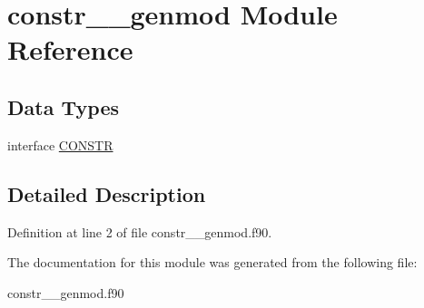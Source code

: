 \hypertarget{classconstr____genmod}{\section{constr\+\_\+\+\_\+genmod Module Reference}
\label{classconstr____genmod}
}
\subsection*{Data Types}
\begin{DoxyCompactItemize}
\item 
interface \hyperlink{interfaceconstr____genmod_1_1_c_o_n_s_t_r}{C\+O\+N\+S\+T\+R}
\end{DoxyCompactItemize}


\subsection{Detailed Description}


Definition at line 2 of file constr\+\_\+\+\_\+genmod.\+f90.



The documentation for this module was generated from the following file\+:\begin{DoxyCompactItemize}
\item 
constr\+\_\+\+\_\+genmod.\+f90\end{DoxyCompactItemize}

